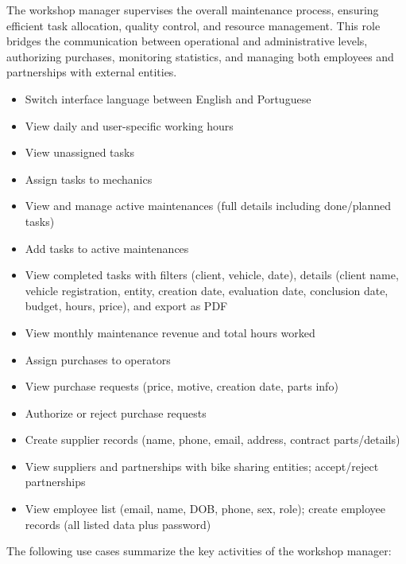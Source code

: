 The workshop manager supervises the overall maintenance process, ensuring efficient task allocation, quality control, and resource management. This role bridges the communication between operational and administrative levels, authorizing purchases, monitoring statistics, and managing both employees and partnerships with external entities.


\begin{itemize}
    \item Switch interface language between English and Portuguese
    \item View daily and user-specific working hours
    \item View unassigned tasks
    \item Assign tasks to mechanics
    \item View and manage active maintenances (full details including done/planned tasks)
    \item Add tasks to active maintenances
    \item View completed tasks with filters (client, vehicle, date), details (client name, vehicle registration, entity, creation date, evaluation date, conclusion date, budget, hours, price), and export as PDF
    \item View monthly maintenance revenue and total hours worked
    \item Assign purchases to operators
    \item View purchase requests (price, motive, creation date, parts info)
    \item Authorize or reject purchase requests
    \item Create supplier records (name, phone, email, address, contract parts/details)
    \item View suppliers and partnerships with bike sharing entities; accept/reject partnerships
    \item View employee list (email, name, DOB, phone, sex, role); create employee records (all listed data plus password)
\end{itemize}

The following use cases summarize the key activities of the workshop manager:

